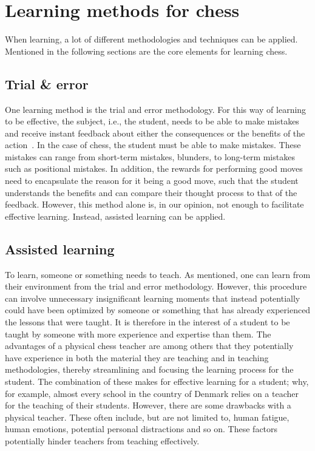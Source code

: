 \section{Learning methods for chess}\label{sec:learning-methods-for-chess}

When learning, a lot of different methodologies and techniques can be applied.
Mentioned in the following sections are the core elements for learning chess.


\subsection{Trial \& error}\label{subsec:trial-and-error}

One learning method is the trial and error methodology.
For this way of learning to be effective, the subject, i.e., the student, needs to be able to make mistakes and receive
instant feedback about either the consequences or the benefits of the action~\cite{li2023}.
In the case of chess, the student must be able to make mistakes.
These mistakes can range from short-term mistakes, blunders, to long-term mistakes such as positional mistakes.
In addition, the rewards for performing good moves need to encapsulate the reason for it being a good move, such that
the student understands the benefits and can compare their thought process to that of the feedback.
However, this method alone is, in our opinion, not enough to facilitate effective learning.
Instead, assisted learning can be applied.


\subsection{Assisted learning}\label{subsec:assisted-learning}

To learn, someone or something needs to teach.
As mentioned, one can learn from their environment from the trial and error methodology.
However, this procedure can involve unnecessary insignificant learning moments that instead potentially could have been
optimized by someone or something that has already experienced the lessons that were taught.
It is therefore in the interest of a student to be taught by someone with more experience and expertise than them.
The advantages of a physical chess teacher are among others that they potentially have experience in both the material
they are teaching and in teaching methodologies, thereby streamlining and focusing the learning process for the student.
The combination of these makes for effective learning for a student; why, for example, almost every school in the
country of Denmark relies on a teacher for the teaching of their students.
However, there are some drawbacks with a physical teacher.
These often include, but are not limited to, human fatigue, human emotions, potential personal distractions and so on.
These factors potentially hinder teachers from teaching effectively.

